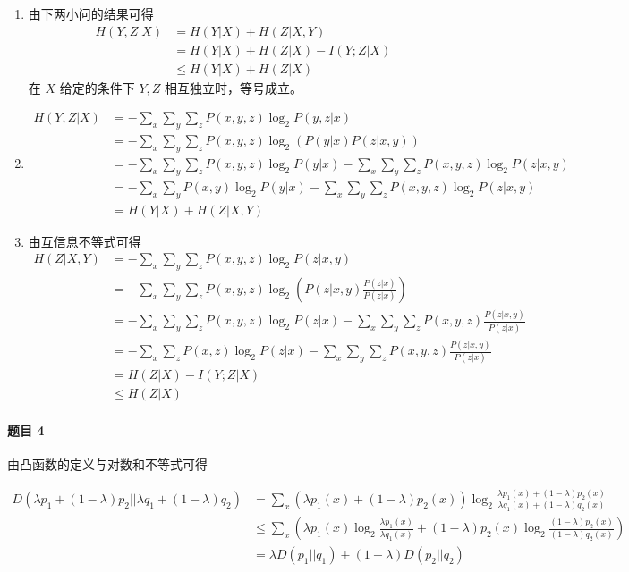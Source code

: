 \documentclass{ctexart}
\begin{document}
\begin{enumerate}
    \item 由下两小问的结果可得\begin{align}
        H(Y, Z|X) &= H(Y|X) + H(Z|X, Y) \\
        &= H(Y|X) + H(Z|X) - I(Y; Z|X) \\
        &\le H(Y|X) + H(Z|X)
    \end{align}在 $X$ 给定的条件下 $Y, Z$ 相互独立时，等号成立。
    \item\begin{align}
        H(Y, Z|X) &= -\sum_x\sum_y\sum_z P(x, y, z)\log_2 P(y, z|x) \\
        &= -\sum_x\sum_y\sum_z P(x, y, z)\log_2(P(y|x)P(z|x, y)) \\
        &= -\sum_x\sum_y\sum_z P(x, y, z)\log_2 P(y|x) -\sum_x\sum_y\sum_z P(x, y, z) \log_2 P(z|x, y) \\
        &= -\sum_x\sum_y P(x, y) \log_2 P(y|x) -\sum_x\sum_y\sum_z P(x, y, z) \log_2 P(z|x, y) \\
        &= H(Y|X) + H(Z|X, Y)
    \end{align}
    \item 由互信息不等式可得\begin{align}
        H(Z|X, Y) &= -\sum_x\sum_y\sum_z P(x, y, z)\log_2 P(z|x, y) \\
        &= -\sum_x\sum_y\sum_z P(x, y, z)\log_2(P(z|x, y)\frac{P(z|x)}{P(z|x)}) \\
        &= -\sum_x\sum_y\sum_z P(x, y, z)\log_2P(z|x) -\sum_x\sum_y\sum_z P(x, y, z)\frac{P(z|x, y)}{P(z|x)} \\
        &= -\sum_x\sum_z P(x, z)\log_2P(z|x) -\sum_x\sum_y\sum_z P(x, y, z)\frac{P(z|x, y)}{P(z|x)} \\
        &= H(Z|X) - I(Y; Z|X) \\
        &\le H(Z|X)
    \end{align}
\end{enumerate}

\paragraph{题目 4}

由凸函数的定义与对数和不等式可得

\begin{align}
    D(\lambda p_1 + (1 - \lambda)p_2 || \lambda q_1 + (1 - \lambda)q_2)
    &= \sum_x (\lambda p_1(x) + (1 - \lambda)p_2(x)) \log_2 \frac{\lambda p_1(x) + (1 - \lambda)p_2(x)}{\lambda q_1(x) + (1 - \lambda)q_2(x)} \\
    &\le \sum_x (\lambda p_1(x) \log_2 \frac{\lambda p_1(x)}{\lambda q_1(x)} + (1 - \lambda)p_2(x) \log_2 \frac{(1 - \lambda)p_2(x)}{(1 - \lambda)q_2(x)}) \\
    &= \lambda D(p_1 || q_1) + (1 - \lambda)D(p_2 || q_2)
\end{align}
\end{document}

